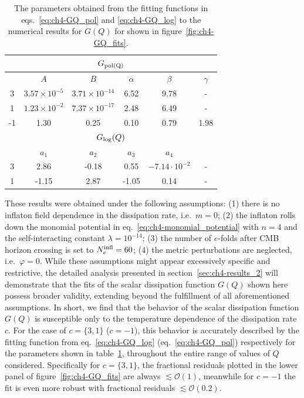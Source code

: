 \begin{table}[ht!]
	\centering
	\begin{tabular}{c|ccccc}
		\toprule
		\hline 
		\multicolumn{6}{c}{$G_{\rm{pol}(Q)}$ }\\
		\hline \diagbox[width=10em]{Value of $c$}{Fit parameters} & $A$ & $B$ & $\alpha$ & $\beta$ &  $\gamma$ \\
		\hline
		3 & $3.57\times10^{-5}$ & $3.71\times10^{-14}$ & 6.52 & 9.78 & - \\
		1 & $1.23\times10^{-2}$ & $7.37\times10^{-17}$ & 2.48 & 6.49 & - \\
		-1 & 1.30 & 0.25 & 0.10 & 0.79 & 1.98 \\
		\hline
		\multicolumn{6}{c}{$G_{\rm{log}}(Q)$}\\
  \hline
  & $a_1$ & $a_2$ & $a_3$ & $a_4$ & \\
		 \hline
		3 & 2.86 & -0.18 & 0.55 & $-7.14\cdot 10^{-2}$ & - \\
		1 & -1.15 & 2.87 & -1.05 & 0.14 & - \\		
		\hline
		\bottomrule
	\end{tabular}
	\caption[Best-fit parameters for the $G(Q)$ fitting functions]{The parameters obtained from the fitting functions in eqs.~\eqref{eq:ch4-GQ_pol} and \eqref{eq:ch4-GQ_log} to the numerical results for $G(Q)$ for shown in figure~\ref{fig:ch4-GQ_fits}.}
	\label{tab:ch4-1}
\end{table}
These results were obtained under the following assumptions: (1) there is no inflaton field dependence in the dissipation rate, i.e.\ $m=0$; (2) the inflaton rolls down the monomial potential in eq.~\eqref{eq:ch4-monomial_potential} with $n=4$ and the self-interacting constant $\lambda=10^{-14}$; (3) the number of $e$-folds after CMB horizon crossing is set to  $N_e^{\rm{infl}}=60$; (4) the metric perturbations are neglected, i.e.\ $\varphi=0$. 
While these assumptions might appear excessively specific and restrictive, the detailed analysis presented in section~\ref{sec:ch4-results_2} will demonstrate that the fits of the scalar dissipation function $G(Q)$ shown here possess broader validity, extending beyond the fulfillment of all aforementioned assumptions. In short, we find that the behavior of the scalar dissipation function $G(Q)$ is susceptible only to the temperature dependence of the dissipation rate $c$. For the case of $c=\{3,1\}$ ($c=-1$), this behavior is accurately described by the fitting function from eq.~\eqref{eq:ch4-GQ_log} (eq.~\eqref{eq:ch4-GQ_pol}) respectively for the parameters shown in table~\ref{tab:ch4-1}, throughout the entire range of values of $Q$ considered. Specifically for $c=\{3,1\}$, the fractional residuals plotted in the lower panel of figure~\ref{fig:ch4-GQ_fits} are always $\lesssim\mathcal{O}(1)$, meanwhile for $c=-1$ the fit is even more robust with fractional residuals $\lesssim \mathcal{O}(0.2)$.

